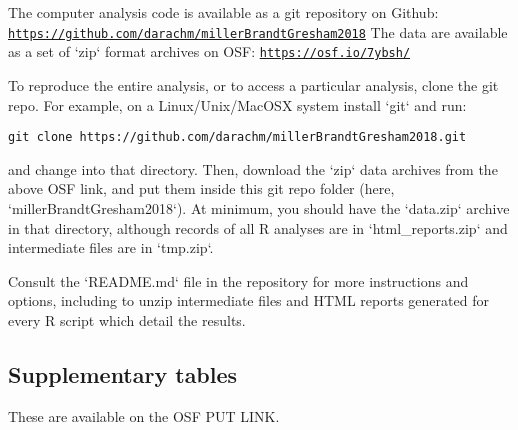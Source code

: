   \begin{flushleft}
  The computer analysis code is available as a git
  repository on Github: \break
  \texttt{\url{https://github.com/darachm/millerBrandtGresham2018}} \break
  The data are available as a set of `zip` format archives on OSF: \break
  \texttt{\url{https://osf.io/7ybsh/}}
  \end{flushleft}
  
  To reproduce the entire analysis, or to access a particular 
  analysis, clone the git repo. For example, on a 
  Linux/Unix/MacOSX system install `git` and run:
  
  \texttt{git clone https://github.com/darachm/millerBrandtGresham2018.git}
  
  \noindent and change into that directory.
  Then, download the `zip` data archives from the above
  OSF link, and put them inside this git repo folder 
  (here, `millerBrandtGresham2018`).
  At minimum, you should have the `data.zip` archive in that directory,
  although records of all R analyses are in `html\_reports.zip`
  and intermediate files are in `tmp.zip`.
  
  Consult the `README.md` file in the repository for more instructions
  and options, including to unzip intermediate files and HTML
  reports generated for every R script which detail the results.




\subsection{Supplementary tables}

These are available on the OSF PUT LINK.

